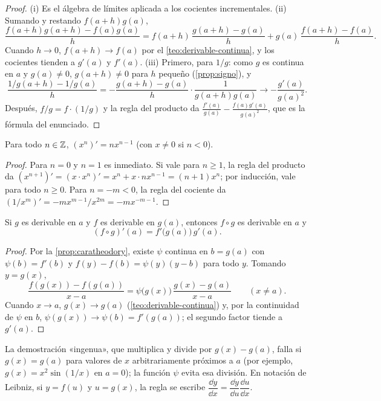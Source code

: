 \begin{proof}
(i) Es el álgebra de límites aplicada a los cocientes incrementales. (ii) Sumando y restando $f(a+h)g(a)$,
\[
\frac{f(a+h)g(a+h)-f(a)g(a)}{h}=f(a+h)\,\frac{g(a+h)-g(a)}{h}+g(a)\,\frac{f(a+h)-f(a)}{h}.
\]
Cuando $h\to0$, $f(a+h)\to f(a)$ por el \cref{teo:derivable-continua}, y los cocientes tienden a $g'(a)$ y $f'(a)$. (iii) Primero, para $1/g$: como $g$ es continua en $a$ y $g(a)\ne0$, $g(a+h)\ne0$ para $h$ pequeño (\cref{prop:signo}), y
\[
\frac{1/g(a+h)-1/g(a)}{h}=-\frac{g(a+h)-g(a)}{h}\cdot\frac{1}{g(a+h)g(a)}\longrightarrow-\frac{g'(a)}{g(a)^{2}}.
\]
Después, $f/g=f\cdot(1/g)$ y la regla del producto da $\frac{f'(a)}{g(a)}-\frac{f(a)g'(a)}{g(a)^{2}}$, que es la fórmula del enunciado.
\end{proof}

\begin{proposicion}\label{prop:potencias}
Para todo $n\in\mathbb{Z}$, $(x^{n})'=nx^{n-1}$ (con $x\ne0$ si $n<0$).
\end{proposicion}

\begin{proof}
Para $n=0$ y $n=1$ es inmediato. Si vale para $n\ge1$, la regla del producto da $(x^{n+1})'=(x\cdot x^{n})'=x^{n}+x\cdot nx^{n-1}=(n+1)x^{n}$; por inducción, vale para todo $n\ge0$. Para $n=-m<0$, la regla del cociente da $(1/x^{m})'=-mx^{m-1}/x^{2m}=-mx^{-m-1}$.
\end{proof}

\begin{teorema}\label{teo:cadena}
Si $g$ es derivable en $a$ y $f$ es derivable en $g(a)$, entonces $f\circ g$ es derivable en $a$ y
\[
(f\circ g)'(a)=f'\bigl(g(a)\bigr)\,g'(a).
\]
\end{teorema}

\begin{proof}
Por la \cref{prop:caratheodory}, existe $\psi$ continua en $b=g(a)$ con $\psi(b)=f'(b)$ y $f(y)-f(b)=\psi(y)(y-b)$ para todo $y$. Tomando $y=g(x)$,
\[
\frac{f(g(x))-f(g(a))}{x-a}=\psi\bigl(g(x)\bigr)\,\frac{g(x)-g(a)}{x-a}\qquad(x\ne a).
\]
Cuando $x\to a$, $g(x)\to g(a)$ (\cref{teo:derivable-continua}) y, por la continuidad de $\psi$ en $b$, $\psi(g(x))\to\psi(b)=f'(g(a))$; el segundo factor tiende a $g'(a)$.
\end{proof}

La demostración «ingenua», que multiplica y divide por $g(x)-g(a)$, falla si $g(x)=g(a)$ para valores de $x$ arbitrariamente próximos a $a$ (por ejemplo, $g(x)=x^{2}\sin(1/x)$ en $a=0$); la función $\psi$ evita esa división. En notación de Leibniz, si $y=f(u)$ y $u=g(x)$, la regla se escribe $\dfrac{\dd y}{\dd x}=\dfrac{\dd y}{\dd u}\dfrac{\dd u}{\dd x}$.

